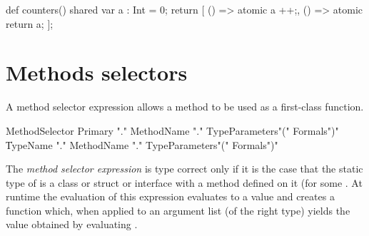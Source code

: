\begin{xten}
  def counters() {
      shared var a : Int = 0;
       return [
          () => {atomic a ++;},
          () => {atomic return a;}
          ];
   }
\end{xten}




\section{Methods selectors}
\label{MethodSelectors}

A method selector expression allows a method to be used as a
first-class function.

\begin{grammar}
MethodSelector \:
        Primary \xcd"."
        MethodName \xcd"."
                TypeParameters\opt \xcd"(" Formals\opt \xcd")" \\
      \|
        TypeName \xcd"."
        MethodName \xcd"."
                TypeParameters\opt \xcd"(" Formals\opt \xcd")" \\
\end{grammar}

The \emph{method selector expression}  is type
correct only if it is the case that the static type of  is a
class or struct or interface with a method
 defined on it (for some
. At runtime the evaluation of this expression
evaluates  to a value  and creates a function 
which, when applied to an argument list  (of the right
type) yields the value obtained by evaluating .

